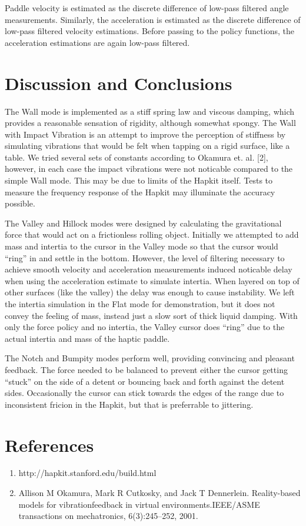 \documentclass{article}
\begin{document}
    Paddle velocity is estimated as the discrete difference of low-pass filtered
    angle measurements.
    Similarly, the acceleration is estimated as the discrete difference of
    low-pass filtered velocity estimations.
    Before passing to the policy functions, the acceleration estimations are
    again low-pass filtered.

\section{Discussion and Conclusions}

The Wall mode is implemented as a stiff spring law and viscous damping, which
provides a reasonable sensation of rigidity, although somewhat spongy.
The Wall with Impact Vibration is an attempt to improve the perception of
stiffness by simulating vibrations that would be felt when tapping on a rigid
surface, like a table. We tried several sets of constants according to Okamura
et. al. [2], however, in each case the impact vibrations were not noticable compared
to the simple Wall mode. This may be due to limits of the Hapkit itself. Tests
to measure the frequency response of the Hapkit may illuminate the accuracy
possible.

The Valley and Hillock modes were designed by calculating the gravitational
force that would act on a frictionless rolling object.
Initially we attempted to add mass and intertia to the cursor in the Valley mode
so that the cursor would ``ring'' in and settle in the bottom.
However, the level of filtering necessary to achieve smooth velocity and acceleration
measurements induced noticable delay when using the acceleration estimate to simulate intertia.
When layered on top of other surfaces (like the valley) the delay was enough to cause instability.
We left the intertia simulation in the Flat mode for demonstration, but it does
not convey the feeling of mass, instead just a slow sort of thick liquid damping.
With only the force policy and no intertia, the Valley cursor does ``ring'' due
to the actual intertia and mass of the haptic paddle.

The Notch and Bumpity modes perform well, providing convincing and pleasant feedback.
The force needed to be balanced to prevent either the cursor getting ``stuck''
on the side of a detent or bouncing back and forth against the detent sides.
Occasionally the cursor can stick towards the edges of the range due to
inconsistent fricion in the Hapkit, but that is preferrable to jittering.

\section{References}
\begin{enumerate}
\item http://hapkit.stanford.edu/build.html

\item Allison M Okamura, Mark R Cutkosky, and Jack T Dennerlein. Reality-based models
for vibrationfeedback  in  virtual  environments.IEEE/ASME transactions on
mechatronics,  6(3):245–252, 2001.
\end{enumerate}
\end{document}
